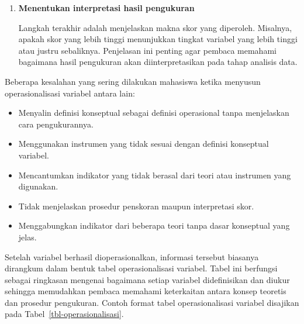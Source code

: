 \documentclass[
  indonesian,
  letterpaper,
  DIV=11,
  numbers=noendperiod]{scrreprt}
\providecommand{\tightlist}{%
  \setlength{\itemsep}{0pt}\setlength{\parskip}{0pt}}
\begin{document}
\begin{enumerate}
  Operasionalisasi variabel juga harus menjelaskan bagaimana jawaban
  responden diubah menjadi skor numerik. Peneliti perlu menjelaskan
  jenis skala yang digunakan (misalnya skala Likert 1--5), cara
  menghitung skor total atau skor setiap dimensi, serta perlakuan
  terhadap item yang bersifat \emph{reverse} apabila ada.
\item
  \textbf{Menentukan interpretasi hasil pengukuran}

  Langkah terakhir adalah menjelaskan makna skor yang diperoleh.
  Misalnya, apakah skor yang lebih tinggi menunjukkan tingkat variabel
  yang lebih tinggi atau justru sebaliknya. Penjelasan ini penting agar
  pembaca memahami bagaimana hasil pengukuran akan diinterpretasikan
  pada tahap analisis data.
\end{enumerate}

\begin{tcolorbox}[enhanced jigsaw, colframe=quarto-callout-tip-color-frame, toptitle=1mm, breakable, leftrule=.75mm, arc=.35mm, toprule=.15mm, colback=white, colbacktitle=quarto-callout-tip-color!10!white, bottomtitle=1mm, bottomrule=.15mm, titlerule=0mm, title={Kesalahan yang Sering Terjadi dalam Operasionalisasi Variabel}, coltitle=black, left=2mm, opacitybacktitle=0.6, opacityback=0, rightrule=.15mm]

Beberapa kesalahan yang sering dilakukan mahasiswa ketika menyusun
operasionalisasi variabel antara lain:

\begin{itemize}
\tightlist
\item
  Menyalin definisi konseptual sebagai definisi operasional tanpa
  menjelaskan cara pengukurannya.
\item
  Menggunakan instrumen yang tidak sesuai dengan definisi konseptual
  variabel.
\item
  Mencantumkan indikator yang tidak berasal dari teori atau instrumen
  yang digunakan.
\item
  Tidak menjelaskan prosedur penskoran maupun interpretasi skor.
\item
  Menggabungkan indikator dari beberapa teori tanpa dasar konseptual
  yang jelas.
\end{itemize}

\end{tcolorbox}

Setelah variabel berhasil dioperasionalkan, informasi tersebut biasanya
dirangkum dalam bentuk tabel operasionalisasi variabel. Tabel ini
berfungsi sebagai ringkasan mengenai bagaimana setiap variabel
didefinisikan dan diukur sehingga memudahkan pembaca memahami
keterkaitan antara konsep teoretis dan prosedur pengukuran. Contoh
format tabel operasionalisasi variabel disajikan pada
Tabel~\ref{tbl-operasionalisasi}.
\end{document}
